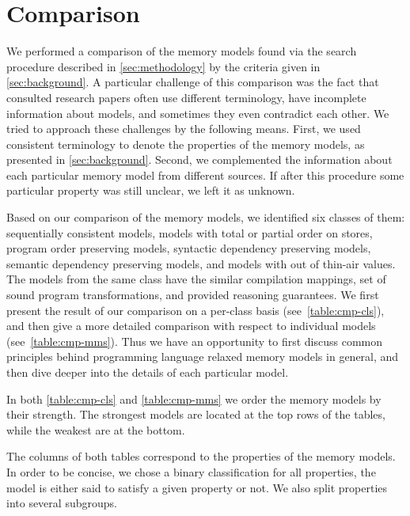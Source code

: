 \section{Comparison}
\label{sec:comparison}

We performed a comparison of the memory models 
found via the search procedure described in \cref{sec:methodology} 
by the criteria given in \cref{sec:background}. 
A particular challenge of this comparison was the fact that 
consulted research papers often use different terminology, 
have incomplete information about models, and 
sometimes they even contradict each other. 
We tried to approach these challenges by the following means.
First, we used consistent terminology 
to denote the properties of the memory models, 
as presented in \cref{sec:background}.
Second, we complemented the information about 
each particular memory model from different sources.
If after this procedure some particular property 
was still unclear, we left it as unknown. 

Based on our comparison of the memory models, 
we identified six classes of them:
sequentially consistent models,
models with total or partial order on stores,
program order preserving models, 
syntactic dependency preserving models, 
semantic dependency preserving models, 
and models with out of thin-air values. 
The models from the same class have the similar compilation mappings, 
set of sound program transformations, and provided reasoning guarantees.
We first present the result of our comparison on a per-class basis 
(see~\cref{table:cmp-cls}), and 
then give a more detailed comparison with respect to individual models
(see~\cref{table:cmp-mms}).
Thus we have an opportunity to first discuss common principles
behind programming language relaxed memory models in general, 
and then dive deeper into the details of each particular model. 



In both \cref{table:cmp-cls} and \cref{table:cmp-mms} we order
the memory models by their strength.  
The strongest models are located at the top rows of the tables, 
while the weakest are at the bottom.  

The columns of both tables correspond 
to the properties of the memory models.
In order to be concise, we chose a binary classification for all properties,
\ie the model is either said to satisfy a given property or not.  
We also split properties into several subgroups.

